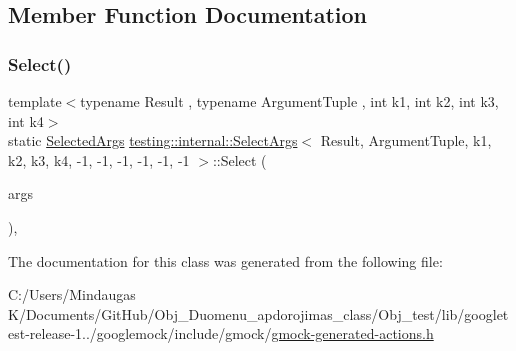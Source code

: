 \subsection{Member Function Documentation}
\mbox{\label{classtesting_1_1internal_1_1_select_args_3_01_result_00_01_argument_tuple_00_01k1_00_01k2_00_01k7cadbb88f40ff7408f8c070bb61c70db_ad5abffa0598dcd102f890549be5ee292}} 
\subsubsection{\texorpdfstring{Select()}{Select()}}
{\footnotesize\ttfamily template$<$typename Result , typename Argument\+Tuple , int k1, int k2, int k3, int k4$>$ \\
static \mbox{\hyperlink{classtesting_1_1internal_1_1_select_args_3_01_result_00_01_argument_tuple_00_01k1_00_01k2_00_01k7cadbb88f40ff7408f8c070bb61c70db_a43b23530d7b427507a4905800f01548b}{Selected\+Args}} \mbox{\hyperlink{classtesting_1_1internal_1_1_select_args}{testing\+::internal\+::\+Select\+Args}}$<$ Result, Argument\+Tuple, k1, k2, k3, k4, -\/1, -\/1, -\/1, -\/1, -\/1, -\/1 $>$\+::Select (\begin{DoxyParamCaption}\item[{const Argument\+Tuple \&}]{args }\end{DoxyParamCaption})\hspace{0.3cm}{\ttfamily [inline]}, {\ttfamily [static]}}



The documentation for this class was generated from the following file\+:\begin{DoxyCompactItemize}
\item 
C\+:/\+Users/\+Mindaugas K/\+Documents/\+Git\+Hub/\+Obj\+\_\+\+Duomenu\+\_\+apdorojimas\+\_\+class/\+Obj\+\_\+test/lib/googletest-\/release-\/1../googlemock/include/gmock/\mbox{\hyperlink{_obj__test_2lib_2googletest-release-1_88_81_2googlemock_2include_2gmock_2gmock-generated-actions_8h}{gmock-\/generated-\/actions.\+h}}\end{DoxyCompactItemize}
